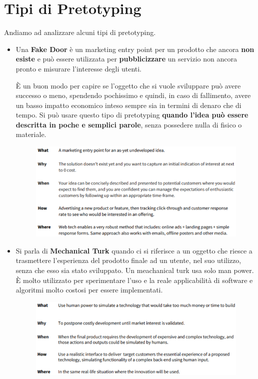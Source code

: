 \documentclass[a4paper,11pt,oneside]{book}
\begin{document}
\section{Tipi di Pretotyping}
Andiamo ad analizzare alcuni tipi di pretotyping.
\begin{itemize}
	\item Una \textbf{Fake Door} è un marketing entry point per un prodotto che ancora \textbf{non esiste} e può essere utilizzata per \textbf{pubblicizzare} un servizio non ancora pronto e misurare l'interesse degli utenti.

	      È un buon modo per capire se l'oggetto che si vuole sviluppare può avere successo o meno, spendendo pochissimo e quindi, in caso di fallimento, avere un basso impatto economico inteso sempre sia in termini di denaro che di tempo. Si può usare
	      questo tipo di pretotyping \textbf{quando l'idea può essere descritta in poche e semplici parole}, senza possedere nulla di fisico o materiale.

	      \begin{figure}[!h]
		      \centering
		      \includegraphics[scale=0.42]{immagini/Fake_door.png}
	      \end{figure}

	\item Si parla di \textbf{Mechanical Turk} quando ci si riferisce a un oggetto che riesce a trasmettere l'esperienza del prodotto finale ad un utente, nel suo utilizzo, senza che esso sia stato sviluppato. Un meachanical turk usa solo man power. È molto utilizzato per sperimentare l'uso e la reale applicabilità di software e algoritmi molto costosi per essere implementati.

	      \begin{figure}[!h]
		      \centering
		      \includegraphics[scale=0.42]{immagini/Mechanical_turk.png}
	      \end{figure}


\end{itemize}
\end{document}
